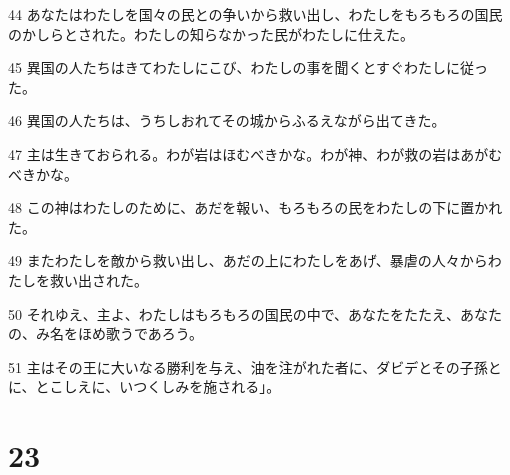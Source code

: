 \par 44 あなたはわたしを国々の民との争いから救い出し、わたしをもろもろの国民のかしらとされた。わたしの知らなかった民がわたしに仕えた。
\par 45 異国の人たちはきてわたしにこび、わたしの事を聞くとすぐわたしに従った。
\par 46 異国の人たちは、うちしおれてその城からふるえながら出てきた。
\par 47 主は生きておられる。わが岩はほむべきかな。わが神、わが救の岩はあがむべきかな。
\par 48 この神はわたしのために、あだを報い、もろもろの民をわたしの下に置かれた。
\par 49 またわたしを敵から救い出し、あだの上にわたしをあげ、暴虐の人々からわたしを救い出された。
\par 50 それゆえ、主よ、わたしはもろもろの国民の中で、あなたをたたえ、あなたの、み名をほめ歌うであろう。
\par 51 主はその王に大いなる勝利を与え、油を注がれた者に、ダビデとその子孫とに、とこしえに、いつくしみを施される」。

\chapter{23}


